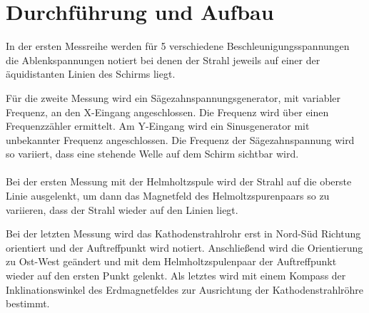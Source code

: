 \section{Durchführung und Aufbau}
\label{sec:Aufbau}
In der ersten Messreihe werden für 5 verschiedene Beschleunigungsspannungen
die Ablenkspannungen notiert bei denen der Strahl jeweils auf einer der
äquidistanten Linien des Schirms liegt.

Für die zweite Messung wird ein Sägezahnspannungsgenerator, mit variabler
Frequenz, an den X-Eingang angeschlossen. Die Frequenz wird über einen Frequenzzähler
ermittelt. Am Y-Eingang wird ein Sinusgenerator mit unbekannter Frequenz
angeschlossen. Die Frequenz der Sägezahnspannung wird so variiert, dass eine
stehende Welle auf dem Schirm sichtbar wird.
\\~\\
Bei der ersten Messung mit der Helmholtzspule wird der Strahl auf die oberste
Linie ausgelenkt, um dann das Magnetfeld des Helmoltzspurenpaars so zu variieren,
dass der Strahl wieder auf den Linien liegt.

Bei der letzten Messung wird das Kathodenstrahlrohr erst in Nord-Süd Richtung
orientiert und der Auftreffpunkt wird notiert. Anschließend wird die Orientierung
zu Ost-West geändert und mit dem Helmholtzspulenpaar der Auftreffpunkt wieder
auf den ersten Punkt gelenkt. Als letztes wird mit einem Kompass der Inklinationswinkel
des Erdmagnetfeldes zur Ausrichtung der Kathodenstrahlröhre bestimmt.
